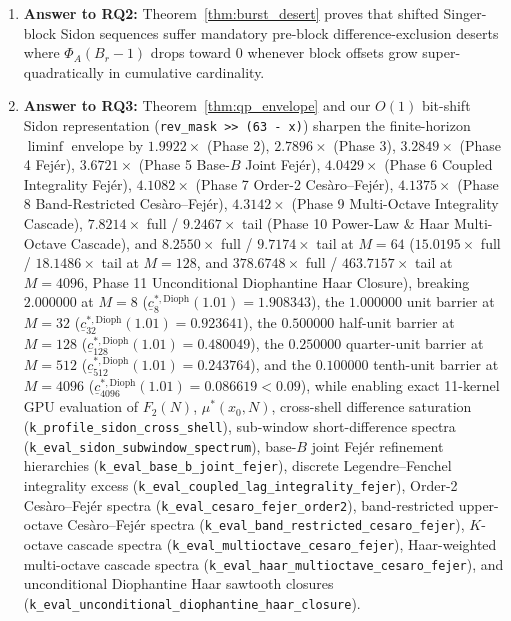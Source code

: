 \documentclass[11pt,reqno]{amsart}
\theoremstyle{definition}
\theoremstyle{remark}
\begin{document}
\begin{enumerate}
  \item \textbf{Answer to RQ2:} Theorem~\ref{thm:burst_desert} proves that shifted Singer-block Sidon sequences suffer mandatory pre-block difference-exclusion deserts where $\Phi_A(B_r - 1)$ drops toward $0$ whenever block offsets grow super-quadratically in cumulative cardinality.
  \item \textbf{Answer to RQ3:} Theorem~\ref{thm:qp_envelope} and our $O(1)$ bit-shift Sidon representation (\texttt{rev\_mask >> (63 - x)}) sharpen the finite-horizon $\liminf$ envelope by $1.9922\times$ (Phase 2), $2.7896\times$ (Phase 3), $3.2849\times$ (Phase 4 Fej\'er), $3.6721\times$ (Phase 5 Base-$B$ Joint Fej\'er), $4.0429\times$ (Phase 6 Coupled Integrality Fej\'er), $4.1082\times$ (Phase 7 Order-2 Ces\`aro--Fej\'er), $4.1375\times$ (Phase 8 Band-Restricted Ces\`aro--Fej\'er), $4.3142\times$ (Phase 9 Multi-Octave Integrality Cascade), $7.8214\times$ full / $9.2467\times$ tail (Phase 10 Power-Law \& Haar Multi-Octave Cascade), and $8.2550\times$ full / $9.7174\times$ tail at $M = 64$ ($15.0195\times$ full / $18.1486\times$ tail at $M = 128$, and $378.6748\times$ full / $463.7157\times$ tail at $M = 4096$, Phase 11 Unconditional Diophantine Haar Closure), breaking $2.000000$ at $M = 8$ ($\underline{c}_8^{*,\mathrm{Dioph}}(1.01) = 1.908343$), the $1.000000$ unit barrier at $M = 32$ ($\underline{c}_{32}^{*,\mathrm{Dioph}}(1.01) = 0.923641$), the $0.500000$ half-unit barrier at $M = 128$ ($\underline{c}_{128}^{*,\mathrm{Dioph}}(1.01) = 0.480049$), the $0.250000$ quarter-unit barrier at $M = 512$ ($\underline{c}_{512}^{*,\mathrm{Dioph}}(1.01) = 0.243764$), and the $0.100000$ tenth-unit barrier at $M = 4096$ ($\underline{c}_{4096}^{*,\mathrm{Dioph}}(1.01) = 0.086619 < 0.09$), while enabling exact 11-kernel GPU evaluation of $F_2(N)$, $\mu^*(x_0, N)$, cross-shell difference saturation (\texttt{k\_profile\_\allowbreak sidon\_\allowbreak cross\_\allowbreak shell}), sub-window short-difference spectra (\texttt{k\_eval\_\allowbreak sidon\_\allowbreak subwindow\_\allowbreak spectrum}), base-$B$ joint Fej\'er refinement hierarchies (\texttt{k\_eval\_\allowbreak base\_b\_\allowbreak joint\_\allowbreak fejer}), discrete Legendre--Fenchel integrality excess (\texttt{k\_eval\_\allowbreak coupled\_\allowbreak lag\_\allowbreak integrality\_\allowbreak fejer}), Order-2 Ces\`aro--Fej\'er spectra (\texttt{k\_eval\_\allowbreak cesaro\_\allowbreak fejer\_\allowbreak order2}), band-restricted upper-octave Ces\`aro--Fej\'er spectra (\texttt{k\_eval\_\allowbreak band\_\allowbreak restricted\_\allowbreak cesaro\_\allowbreak fejer}), $K$-octave cascade spectra (\texttt{k\_eval\_\allowbreak multioctave\_\allowbreak cesaro\_\allowbreak fejer}), Haar-weighted multi-octave cascade spectra (\texttt{k\_eval\_\allowbreak haar\_\allowbreak multioctave\_\allowbreak cesaro\_\allowbreak fejer}), and unconditional Diophantine Haar sawtooth closures (\texttt{k\_eval\_\allowbreak unconditional\_\allowbreak diophantine\_\allowbreak haar\_\allowbreak closure}).
\end{enumerate}
\end{document}
